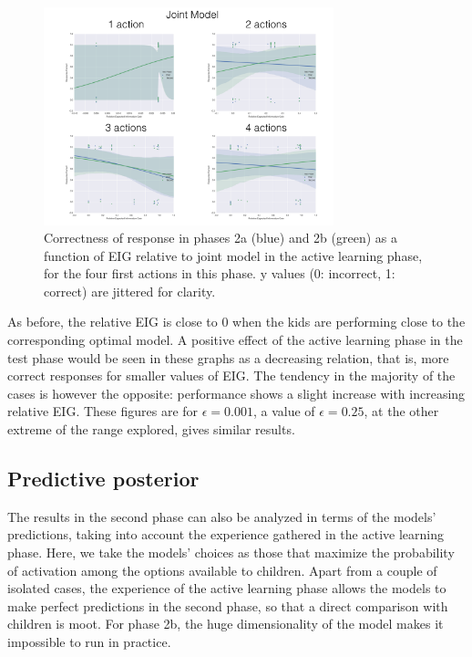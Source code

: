 \documentclass[11pt, a4paper]{article}
\begin{document}
\begin{figure}[h!]
\begin{center}
\includegraphics[width=0.75\textwidth]{../Plots/LogRegPlots/LogRegPlots_joint.png}
\end{center}
\caption{Correctness of response in phases 2a (blue) and 2b (green) as a function of EIG relative to joint model in the active learning phase, for the four first actions in this phase. y values (0: incorrect, 1: correct) are jittered for clarity.}
\label{fig:logreg_joint}
\end{figure}

As before, the relative EIG is close to 0 when the kids are performing close to the corresponding optimal model. A positive effect of the active learning phase in the test phase would be seen in these graphs as a decreasing relation, that is, more correct responses for smaller values of EIG. The tendency in the majority of the cases is however the opposite: performance shows a slight increase with increasing relative EIG. These figures are for $\epsilon=0.001$, a value of $\epsilon=0.25$, at the other extreme of the range explored, gives similar results.


\subsection*{Predictive posterior}
The results in the second phase can also be analyzed in terms of the models' predictions, taking into account the experience gathered in the active learning phase. Here, we take the models' choices as those that maximize the probability of activation among the options available to children. Apart from a couple of isolated cases, the experience of the active learning phase allows the models to make perfect predictions in the second phase, so that a direct comparison with children is moot. For phase 2b, the huge dimensionality of the model makes it impossible to run in practice.
\end{document}
